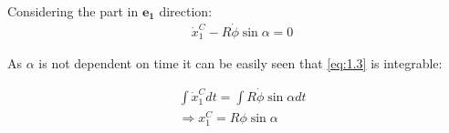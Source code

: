 Considering the part in $\boldsymbol{e_1}$ direction:
\begin{equation}\label{eq:1.3}
    \begin{split}
        &\dot x_1^C - R\dot\phi\sin\alpha = 0 
    \end{split}
\end{equation}

As $\alpha$ is not dependent on time it can be easily seen that \ref{eq:1.3} is integrable:

\begin{equation}\label{eq:1.4}
    \begin{split}
        &\int\dot x_1^Cdt = \int R\dot\phi\sin\alpha dt\\
        &\Rightarrow x_1^C = R\phi\sin\alpha
    \end{split}
\end{equation}


